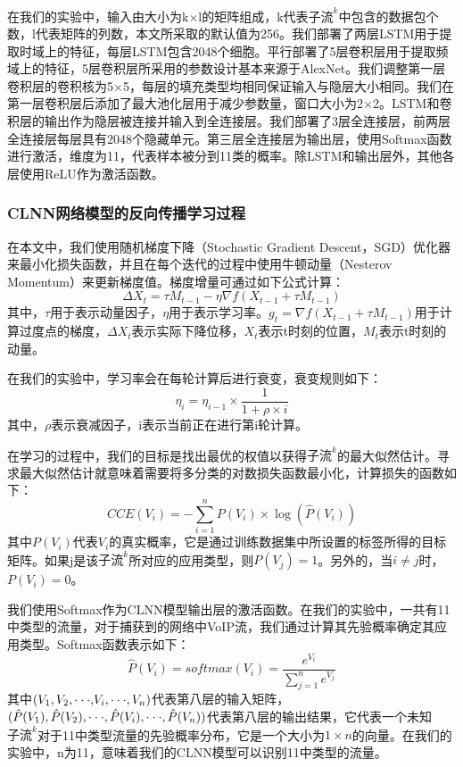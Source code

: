 在我们的实验中，输入由大小为k$\times$l的矩阵组成，k代表$\text{子流}^k$中包含的数据包个数，l代表矩阵的列数，本文所采取的默认值为256。我们部署了两层LSTM用于提取时域上的特征，每层LSTM包含2048个细胞。平行部署了5层卷积层用于提取频域上的特征，5层卷积层所采用的参数设计基本来源于AlexNet。我们调整第一层卷积层的卷积核为5$\times$5，每层的填充类型均相同保证输入与隐层大小相同。我们在第一层卷积层后添加了最大池化层用于减少参数量，窗口大小为2$\times$2。LSTM和卷积层的输出作为隐层被连接并输入到全连接层。我们部署了3层全连接层，前两层全连接层每层具有2048个隐藏单元。第三层全连接层为输出层，使用Softmax函数进行激活，维度为11，代表样本被分到11类的概率。除LSTM和输出层外，其他各层使用ReLU作为激活函数。


\subsubsection{CLNN网络模型的反向传播学习过程}
在本文中，我们使用随机梯度下降（Stochastic Gradient Descent，SGD）优化器来最小化损失函数，并且在每个迭代的过程中使用牛顿动量（Nesterov Momentum）来更新梯度值。梯度增量可通过如下公式计算：
\begin{equation}
\Delta {X_t} = \tau {M_{t - 1}} - \eta \nabla f({X_{t - 1}} + \tau {M_{t - 1}})
\end{equation}
其中，${\tau}$用于表示动量因子，${\eta}$用于表示学习率。${g_t} = \nabla f({X_{t - 1}} + \tau {M_{t - 1}})$用于计算过度点的梯度，$\Delta {X_t}$表示实际下降位移，${X_t}$表示t时刻的位置，${M_t}$表示t时刻的动量。

在我们的实验中，学习率会在每轮计算后进行衰变，衰变规则如下：
\begin{equation}
\label{equ:decay}
{\eta _i} = {\eta _{i - 1}} \times \frac{1}{{1 + \rho  \times i}}
\end{equation}
其中，${\rho }$表示衰减因子，i表示当前正在进行第i轮计算。

在学习的过程中，我们的目标是找出最优的权值以获得$\text{子流}^k$的最大似然估计。寻求最大似然估计就意味着需要将多分类的对数损失函数最小化，计算损失的函数如下：
\begin{equation}
CCE({V_i}) =  - \sum\limits_{i = 1}^n {P({V_i}) \times \log (\hat P({V_i}))}
\end{equation}
其中$P({V_i})$代表${V_i}$的真实概率，它是通过训练数据集中所设置的标签所得的目标矩阵。如果j是该$\text{子流}^k$所对应的应用类型，则$P({V_j})=1$。另外的，当$i \ne j$时，$P({V_i})=0$。

我们使用Softmax作为CLNN模型输出层的激活函数。在我们的实验中，一共有11中类型的流量，对于捕获到的网络中VoIP流，我们通过计算其先验概率确定其应用类型。Softmax函数表示如下：
\begin{equation}
\hat P({V_i}) = softmax({V_i}) = \frac{{{e^{{V_i}}}}}{{\sum\limits_{j = 1}^n {{e^{{V_j}}}} }}
\end{equation}
其中$({V_1},{V_2},{\rm{\cdot\cdot\cdot,}}{V_i},{\rm{\cdot\cdot\cdot}},{V_n})$代表第八层的输入矩阵，$(\hat P({V_1}),\hat P({V_2}),{\rm{\cdot\cdot\cdot}},\hat P({V_i}),{\rm{\cdot\cdot\cdot}},\hat P({V_n}))$代表第八层的输出结果，它代表一个未知$\text{子流}^k$对于11中类型流量的先验概率分布，它是一个大小为$1 \times n$的向量。在我们的实验中，n为11，意味着我们的CLNN模型可以识别11中类型的流量。






